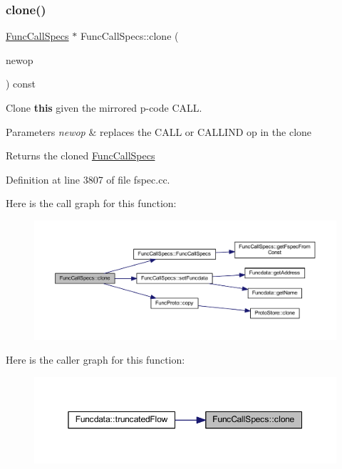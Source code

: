 \subsubsection{\texorpdfstring{clone()}{clone()}}
{\footnotesize\ttfamily \mbox{\hyperlink{class_func_call_specs}{Func\+Call\+Specs}} $\ast$ Func\+Call\+Specs\+::clone (\begin{DoxyParamCaption}\item[{\mbox{\hyperlink{class_pcode_op}{Pcode\+Op}} $\ast$}]{newop }\end{DoxyParamCaption}) const}



Clone {\bfseries{this}} given the mirrored p-\/code C\+A\+LL. 


\begin{DoxyParams}{Parameters}
{\em newop} & replaces the C\+A\+LL or C\+A\+L\+L\+I\+ND op in the clone \\
\hline
\end{DoxyParams}
\begin{DoxyReturn}{Returns}
the cloned \mbox{\hyperlink{class_func_call_specs}{Func\+Call\+Specs}} 
\end{DoxyReturn}


Definition at line 3807 of file fspec.\+cc.

Here is the call graph for this function\+:
\nopagebreak
\begin{figure}[H]
\begin{center}
\leavevmode
\includegraphics[width=350pt]{class_func_call_specs_ac649b58eb85cf052096ac32e5ced8607_cgraph}
\end{center}
\end{figure}
Here is the caller graph for this function\+:
\nopagebreak
\begin{figure}[H]
\begin{center}
\leavevmode
\includegraphics[width=350pt]{class_func_call_specs_ac649b58eb85cf052096ac32e5ced8607_icgraph}
\end{center}
\end{figure}
\mbox{\label{class_func_call_specs_a57f3844d92136d3ab6b67ea9ea316aa7}} 
